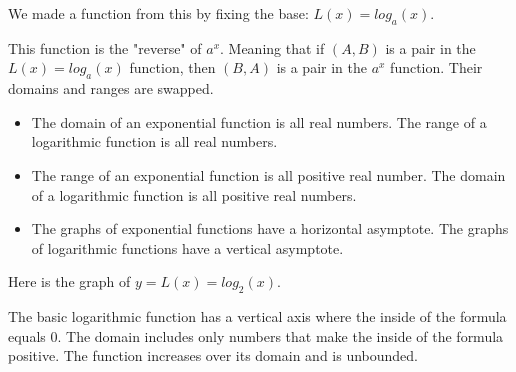 \documentclass{ximera}
\begin{document}
We made a function from this by fixing the base:  $L(x) = log_a(x)$.


This function is the "reverse" of $a^x$.  Meaning that if $(A, B)$ is a pair in the $L(x) = log_a(x)$ function, then $(B, A)$ is a pair in the $a^x$ function. Their domains and ranges are swapped.


\begin{itemize}

\item The domain of an exponential function is all real numbers. The range of a logarithmic function is all real numbers.  


\item The range of an exponential function is all positive real number. The domain of a logarithmic function is all positive real numbers.

\item The graphs of exponential functions have a horizontal asymptote. The graphs of logarithmic functions have a vertical asymptote. 

\end{itemize}






Here is the graph of $y = L(x) = log_2(x)$.

\begin{image}
\end{image}





The basic logarithmic function has a vertical axis where the inside of the formula equals $0$.  The domain includes only numbers that make the inside of the formula positive. The function increases over its domain and is unbounded.
\end{document}
